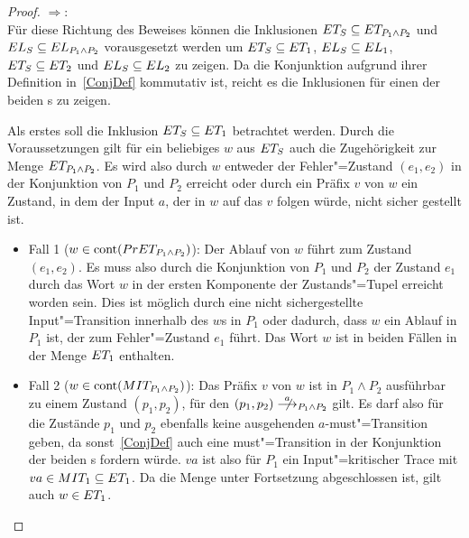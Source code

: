 \begin{proof}
  \glqq $\Rightarrow$\grqq{}:\\
  Für diese Richtung des Beweises können die Inklusionen $ET _S\subseteq ET
  _{P_1\land P_2}$ und $EL _S\subseteq EL _{P_1\land P_2}$ vorausgesetzt
  werden um $ET _S\subseteq ET _1$, $EL _S\subseteq EL _1$, $ET
  _S\subseteq ET _2$ und $EL _S\subseteq EL _2$ zu zeigen. Da die
  Konjunktion aufgrund ihrer Definition in~\ref{ConjDef} kommutativ ist, reicht
  es die Inklusionen für einen der beiden \MEIO{}s zu zeigen.

  Als erstes soll die Inklusion $ET _S\subseteq ET _1$ betrachtet werden.
  Durch die Voraussetzungen gilt für ein beliebiges $w$ aus $ET _S$ auch die
  Zugehörigkeit zur Menge $ET _{P_1\land P_2}$. Es wird also durch $w$
  entweder der Fehler"=Zustand $(e_1,e_2)$ in der Konjunktion von $P_1$ und
  $P_2$ erreicht oder durch ein Präfix $v$ von $w$ ein Zustand, in dem der
  Input $a$, der in $w$ auf das $v$ folgen würde, nicht sicher gestellt ist.
  \begin{itemize}
    \item Fall 1 ($w\in\mathrm{cont} (PrET _{P_1\land P_2})$): Der Ablauf von $w$
      führt zum Zustand $(e_1,e_2)$. Es muss also durch die Konjunktion von
      $P_1$ und $P_2$ der Zustand $e_1$ durch das Wort $w$ in der ersten
      Komponente der Zustands"=Tupel erreicht worden sein. Dies ist möglich
      durch eine nicht sichergestellte Input"=Transition innerhalb des $w$s in
      $P_1$ oder dadurch, dass $w$ ein Ablauf in $P_1$ ist, der zum
      Fehler"=Zustand $e_1$ führt. Das Wort $w$ ist in beiden Fällen in der
      Menge $ET _1$ enthalten.
    \item Fall 2 ($w\in\mathrm{cont} (MIT _{P_1\land P_2})$): Das Präfix $v$ von $w$
      ist in $P_1\land P_2$ ausführbar zu einem Zustand $(p_1,p_2)$, für den
      $(p_1,p_2)\nmust[a]_{P_1\land P_2}$ gilt. Es darf also für die Zustände
      $p_1$ und $p_2$ ebenfalls keine ausgehenden $a$-must"=Transition geben,
      da sonst~\ref{ConjDef} auch eine must"=Transition in der Konjunktion der
      beiden \MEIO{}s fordern würde. $va$ ist also für $P_1$ ein
      Input"=kritischer Trace mit $va\in MIT _1\subseteq ET _1$. Da die Menge
      \ET{} unter Fortsetzung abgeschlossen ist, gilt auch $w\in ET _1$.
  \end{itemize}


\end{proof}
